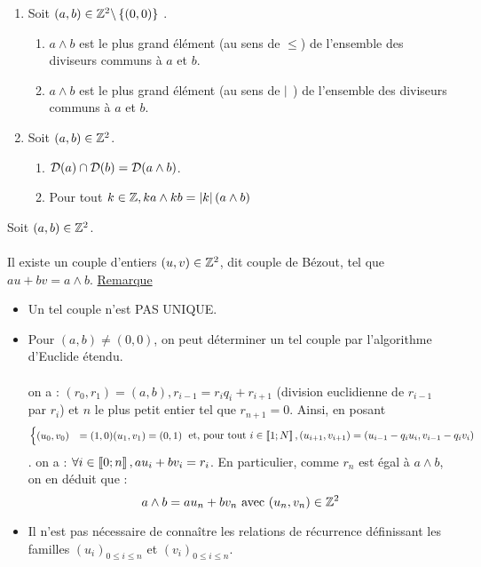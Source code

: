 \begin{defprop}
    \begin{enumerate}
        \item Soit \((a, b) \in \mathbb{Z}^2 \backslash \left\lbrace(0, 0)\right\rbrace\) .
        \begin{enumerate}
            \item \(a \wedge b\) est le plus grand élément (au sens de \(\leq\)) de l’ensemble des diviseurs communs à \(a\) et \(b\).
            \item \(a \wedge b\) est le plus grand élément (au sens de \(\mid\) ) de l’ensemble des diviseurs communs à \(a\) et \(b\).
        \end{enumerate}
        \item Soit \((a, b) \in \mathbb{Z}^2\).
        \begin{enumerate}
            \item \(\mathcal{D}(a) \cap \mathcal{D}(b) = \mathcal{D}(a \wedge b)\).
            \item Pour tout \(k \in \mathbb{Z}, ka \wedge kb = \left\lvert k\right\rvert (a \wedge b) \)
        \end{enumerate}
    \end{enumerate}
\end{defprop}

\begin{defprop}
    Soit \((a, b) \in \mathbb{Z}^2\).\\~\\
    Il existe un couple d’entiers \((u, v) \in \mathbb{Z}^2\), dit couple de Bézout, tel que \(au + bv = a \wedge b\).
    \underline{Remarque}
    \begin{itemize}
    \item  Un tel couple n’est PAS UNIQUE.
    \item  Pour \((a, b) \neq (0, 0)\), on peut déterminer un tel couple par l’algorithme d’Euclide étendu.\\~\\
    on a : \((r_0, r_1) = (a, b), r_{i-1} = r_iq_i + r_{i+1}\) (division euclidienne de \(r_{i-1}\) par \(r_i\)) et \(n\) le plus petit entier tel que \(r_{n+1} = 0\). Ainsi, en posant
    \[\begin{cases}
    (u_0, v_0) &= (1, 0)
    (u_1, v_1) = (0, 1)\end{cases}\text{ et, pour tout }i \in \left\llbracket1;N\right\rrbracket , (u_{i+1}, v_{i+1}) = (u_{i-1} - q_i u_i, v_{i-1} - q_iv_i)\] .
    on a : \(\forall i \in \left\llbracket0;n\right\rrbracket , a u_i + b v_i = r_i\). En particulier, comme \(r_n\) est égal à \(a \wedge b\), on en déduit que :
    \[a \wedge b = au_n + bv_n\text{ avec }(u_n, v_n) \in \mathbb{Z}^2\]
    \item Il n’est pas nécessaire de connaître les relations de récurrence définissant les familles \( (u_i)_{0\leq i \leq n}\) et \((v_i)_{0\leq i \leq n}\).
    \end{itemize}
\end{defprop}

